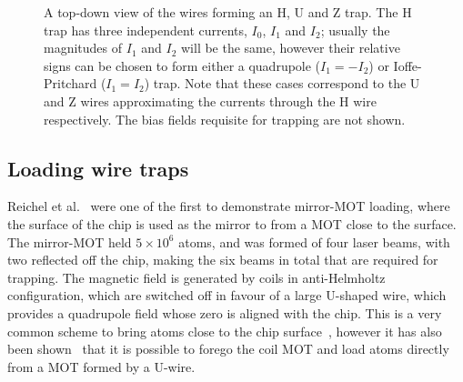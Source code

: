 \begin{figure}
  \centering
{}
  \caption{
    A top-down view of the wires forming an H, U and Z trap. The H trap has
    three independent currents, $I_0$, $I_1$ and $I_2$; usually the magnitudes
    of $I_1$ and $I_2$ will be the same, however their relative signs can be
    chosen to form either a quadrupole ($I_1 = -I_2$) or Ioffe-Pritchard ($I_1 =
    I_2$) trap. Note that these cases correspond to the U and Z wires
    approximating the currents through the H wire respectively. The bias fields
    requisite for trapping are not shown.
  }
  \label{chiptraps:fig:trapvariations}
\end{figure}


\subsection{Loading wire traps}

Reichel et al.~\cite{Reichel1999} were one of the first to demonstrate
mirror-MOT loading, where the surface of the chip is used as the mirror to from
a MOT close to the surface. The \esRb{} mirror-MOT held $5\times10^6$ atoms,
and was formed of four laser beams, with two reflected off the chip, making the
six beams in total that are required for trapping. The magnetic field is
generated by coils in anti-Helmholtz configuration, which are switched off in
favour of a large U-shaped wire, which provides a quadrupole field whose zero is
aligned with the chip. This is a very common scheme to bring atoms close to the
chip surface~\cite{Folman2000, PhysRevLett.97.200405, 2011Ac, Boehi2009},
however it has also been shown~\cite{0256-307X-25-9-034} that it is possible to
forego the coil MOT and load atoms directly from a MOT formed by a U-wire.

